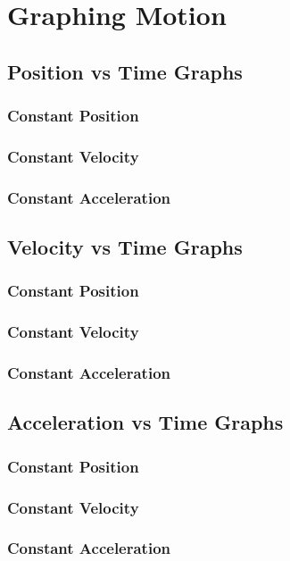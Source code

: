\chapter{Graphing Motion}
	\section{Position vs Time Graphs}
		\subsection{Constant Position}
		\subsection{Constant Velocity}
		\subsection{Constant Acceleration}
	\section{Velocity vs Time Graphs}
		\subsection{Constant Position}
		\subsection{Constant Velocity}
		\subsection{Constant Acceleration}
	\section{Acceleration vs Time Graphs}
		\subsection{Constant Position}
		\subsection{Constant Velocity}
		\subsection{Constant Acceleration}	
	

	


